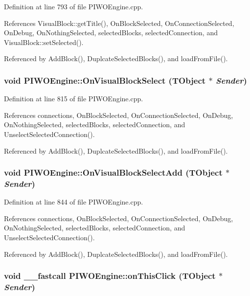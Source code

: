Definition at line 793 of file PIWOEngine.cpp.

References VisualBlock::getTitle(), OnBlockSelected, OnConnectionSelected, OnDebug, OnNothingSelected, selectedBlocks, selectedConnection, and VisualBlock::setSelected().

Referenced by AddBlock(), DuplcateSelectedBlocks(), and loadFromFile().\hypertarget{classPIWOEngine_94a545e2d82c78fffc68c79f53db4a72}{
\subsubsection[OnVisualBlockSelect]{\setlength{\rightskip}{0pt plus 5cm}void PIWOEngine::OnVisualBlockSelect (TObject $\ast$ {\em Sender})}}
\label{classPIWOEngine_94a545e2d82c78fffc68c79f53db4a72}




Definition at line 815 of file PIWOEngine.cpp.

References connections, OnBlockSelected, OnConnectionSelected, OnDebug, OnNothingSelected, selectedBlocks, selectedConnection, and UnselectSelectedConnection().

Referenced by AddBlock(), DuplcateSelectedBlocks(), and loadFromFile().\hypertarget{classPIWOEngine_7ec3c8295c1984c7661c813881fb5bda}{
\subsubsection[OnVisualBlockSelectAdd]{\setlength{\rightskip}{0pt plus 5cm}void PIWOEngine::OnVisualBlockSelectAdd (TObject $\ast$ {\em Sender})}}
\label{classPIWOEngine_7ec3c8295c1984c7661c813881fb5bda}




Definition at line 844 of file PIWOEngine.cpp.

References connections, OnBlockSelected, OnConnectionSelected, OnDebug, OnNothingSelected, selectedBlocks, selectedConnection, and UnselectSelectedConnection().

Referenced by AddBlock(), DuplcateSelectedBlocks(), and loadFromFile().\hypertarget{classPIWOEngine_c0f3009bc8be06d0242546f8a2e6fc94}{
\subsubsection[onThisClick]{\setlength{\rightskip}{0pt plus 5cm}void \_\-\_\-fastcall PIWOEngine::onThisClick (TObject $\ast$ {\em Sender})}}
\label{classPIWOEngine_c0f3009bc8be06d0242546f8a2e6fc94}




